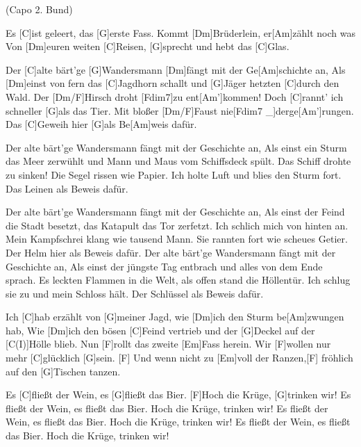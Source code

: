

\hfill{\footnotesize(Capo 2. Bund)}



\begin{guitar}
	Es [C]ist geleert, das [G]erste Fass. Kommt [Dm]Brüderlein, er[Am]zählt noch was
	Von [Dm]euren weiten [C]Reisen, [G]sprecht und hebt das [C]Glas.
	
	Der [C]alte bärt'ge [G]Wandersmann [Dm]fängt mit der Ge[Am]schichte an,
	Als [Dm]einst von fern das [C]Jagdhorn schallt und [G]Jäger hetzten [C]durch den Wald.
	Der [Dm/F]Hirsch droht [Fdim7]zu ent[Am']kommen! Doch [C]rannt' ich schneller [G]als das Tier.
	Mit bloßer [Dm/F]Faust nie[Fdim7 _]{derge}[Am']rungen. Das [C]Geweih hier [G]als Be[Am]weis dafür.
	
	Der alte bärt'ge Wandersmann fängt mit der Geschichte an,
	Als einst ein Sturm das Meer zerwühlt und Mann und Maus vom Schiffsdeck spült.
	Das Schiff drohte zu sinken! Die Segel rissen wie Papier.
	Ich holte Luft und blies den Sturm fort. Das Leinen als Beweis dafür.
	
	 
	
	Der alte bärt'ge Wandersmann fängt mit der Geschichte an,
	Als einst der Feind die Stadt besetzt, das Katapult das Tor zerfetzt.
	Ich schlich mich von hinten an. Mein Kampfschrei klang wie tausend Mann.
	Sie rannten fort wie scheues Getier. Der Helm hier als Beweis dafür.
	\pagebreak
	Der alte bärt'ge Wandersmann fängt mit der Geschichte an,
	Als einst der jüngste Tag entbrach und alles von dem Ende sprach.
	Es leckten Flammen in die Welt, als offen stand die Höllentür.
	Ich schlug sie zu und mein Schloss hält. Der Schlüssel als Beweis dafür.
	
	 
	
	Ich [C]hab erzählt von [G]meiner Jagd, wie [Dm]ich den Sturm be[Am]zwungen hab,
	Wie [Dm]ich den bösen [C]Feind vertrieb und der [G]Deckel auf der [C(I)]Hölle blieb.
	Nun [F]rollt das zweite [Em]Fass herein. Wir [F]wollen nur mehr [C]glücklich [G]sein.
	[F] Und wenn nicht zu [Em]voll der Ranzen,[F] fröhlich auf den [G]Tischen tanzen.
	
	Es [C]fließt der Wein, es [G]fließt das Bier. [F]Hoch die Krüge, [G]trinken wir!
	Es fließt der Wein, es fließt das Bier. Hoch die Krüge, trinken wir!
	Es fließt der Wein, es fließt das Bier. Hoch die Krüge, trinken wir!
	Es fließt der Wein, es fließt das Bier. Hoch die Krüge, trinken wir!
\end{guitar}




